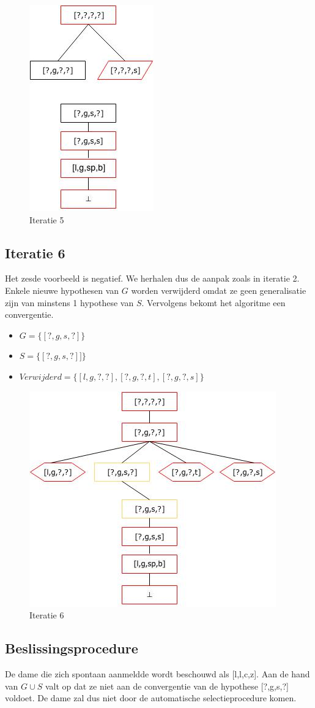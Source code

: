 \documentclass{article}
\begin{document}
\begin{figure}[H]
\centering
\caption{Iteratie 5}
\label{iteratie5}
\includegraphics[scale=0.5]{iteration_graphs/iteration5.jpg}
\end{figure}

\newpage

\subsection{Iteratie 6}
Het zesde voorbeeld is negatief. We herhalen dus de aanpak zoals in iteratie 2. Enkele nieuwe hypothesen van $G$ worden verwijderd omdat ze geen generalisatie zijn van minstens 1 hypothese van $S$. Vervolgens bekomt het algoritme een convergentie.

\begin{itemize}
\item $G = \{[?,g,s,?]\}$
\item $S = \{[?,g,s,?]]\}$
\item $Verwijderd = \{[l,g,?,?],[?,g,?,t],[?,g,?,s]\}$
\end{itemize}

\begin{figure}[H]
\centering
\caption{Iteratie 6}
\label{iteratie6}
\includegraphics[scale=0.5]{iteration_graphs/iteration6.jpg}
\end{figure}

\subsection{Beslissingsprocedure}
De dame die zich spontaan aanmeldde wordt beschouwd als [l,l,c,z]. Aan de hand van $G \cup S$ valt op dat ze niet aan de convergentie van de hypothese [?,g,s,?] voldoet. De dame zal dus niet door de automatische selectieprocedure komen.
\end{document}
